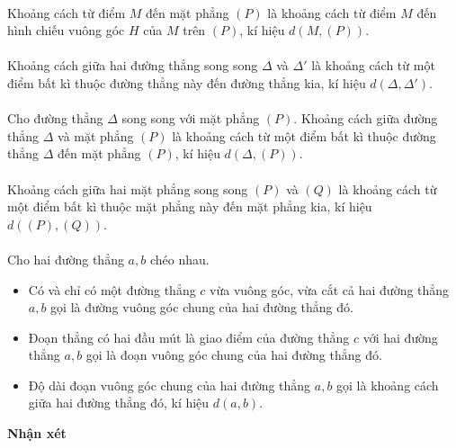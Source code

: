 \documentclass[12pt,a4paper]{extarticle}
\begin{document}
\noindent\textbf{\color{myblue}{2. Khoảng cách từ một điểm đến một mặt phẳng}}\\
Khoảng cách từ điểm $M$ đến mặt phẳng $(P)$ là khoảng cách từ điểm $M$ đến hình chiếu vuông góc $H$ của $M$ trên $(P)$, kí hiệu $d(M, (P))$.\\
\noindent\textbf{\color{myblue}{3. Khoảng cách giữa hai đường thẳng song song}}\\
Khoảng cách giữa hai đường thẳng song song $\Delta$ và $\Delta'$ là khoảng cách từ một điểm bất kì thuộc đường thẳng này đến đường thẳng kia, kí hiệu $d(\Delta, \Delta')$.\\
\noindent\textbf{\color{myblue}{4. Khoảng cách giữa đường thẳng và mặt phẳng song song}}\\
Cho đường thẳng $\Delta$ song song với mặt phẳng $(P)$. Khoảng cách giữa đường thẳng $\Delta$ và mặt phẳng $(P)$ là khoảng cách từ một điểm bất kì thuộc đường thẳng $\Delta$ đến mặt phẳng $(P)$, kí hiệu $d(\Delta, (P))$.\\
\noindent\textbf{\color{myblue}{5. Khoảng cách giữa hai mặt phẳng song song}}\\
Khoảng cách giữa hai mặt phẳng song song $(P)$ và $(Q)$ là khoảng cách từ một điểm bất kì thuộc mặt phẳng này đến mặt phẳng kia, kí hiệu $d((P), (Q))$.\\
\noindent\textbf{\color{myblue}{6. Khoảng cách giữa hai đường thẳng chéo nhau}}\\
Cho hai đường thẳng $a, b$ chéo nhau.
\begin{itemize}
	\item Có và chỉ có một đường thẳng $c$ vừa vuông góc, vừa cắt cả hai đường thẳng $a, b$ gọi là đường vuông góc chung của hai đường thẳng đó.
	\item Đoạn thẳng có hai đầu mút là giao điểm của đường thẳng $c$ với hai đường thẳng $a, b$ gọi là đoạn vuông góc chung của hai đường thẳng đó.
	\item Độ dài đoạn vuông góc chung của hai đường thẳng $a, b$ gọi là khoảng cách giữa hai đường thẳng đó, kí hiệu $d(a, b)$.
\end{itemize}
\vspace{0.2cm}
\noindent\textbf{Nhận xét}
\end{document}
